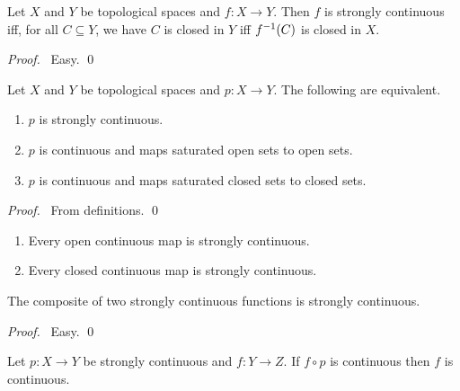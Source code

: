 \begin{prop}
  Let $X$ and $Y$ be topological spaces and $f : X \rightarrow Y$. Then $f$ is strongly continuous iff, for all $C \subseteq Y$, we have $C$ is closed in $Y$ iff ${f}^{-1}(C)$ is closed in $X$.
\end{prop}

\begin{proof}
  \pf\ Easy. \qed
\end{proof}

\begin{prop}
  \label{prop:strongly_continuous}
  Let $X$ and $Y$ be topological spaces and $p : X \rightarrow Y$. The following are equivalent.
  \begin{enumerate}
    \item
    $p$ is strongly continuous.
    \item
    $p$ is continuous and maps saturated open sets to open sets.
    \item
    $p$ is continuous and maps saturated closed sets to closed sets.
  \end{enumerate}
\end{prop}

\begin{proof}
  \pf\ From definitions. \qed
\end{proof}

\begin{cor}
  \label{cor:strongly_continuous:open_closed}
  \begin{enumerate}
    \item Every open continuous map is strongly continuous.
    \item Every closed continuous map is strongly continuous.
  \end{enumerate}
\end{cor}

\begin{prop}
The composite of two strongly continuous functions is strongly continuous.
\end{prop}

\begin{proof}
  \pf\ Easy. \qed
\end{proof}

\begin{prop}
  \label{prop:strongly_continuous:continuous}
  Let $p : X \rightarrow Y$ be strongly continuous and $f : Y \rightarrow Z$. If $f \circ p$ is continuous then $f$ is continuous.
\end{prop}


